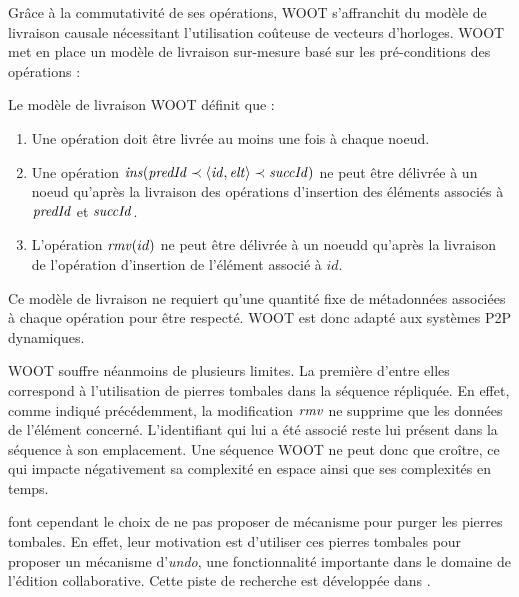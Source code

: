 Grâce à la commutativité de ses opérations, WOOT s'affranchit du modèle de livraison causale nécessitant l'utilisation coûteuse de vecteurs d'horloges.
WOOT met en place un modèle de livraison sur-mesure basé sur les pré-conditions des opérations :
\begin{definition}
  Le modèle de livraison WOOT définit que :
  \begin{enumerate}[label=(\roman*)]
    \item Une opération doit être livrée au moins une fois à chaque noeud\footnotemark.
    \item Une opération $\mathit{ins}(\mathit{predId} \prec \langle \mathit{id},\mathit{elt} \rangle \prec \mathit{succId})$ ne peut être délivrée à un noeud qu'après la livraison des opérations d'insertion des éléments associés à $\mathit{predId}$ et $\mathit{succId}$.
    \item L'opération $\mathit{rmv}(id)$ ne peut être délivrée à un noeudd qu'après la livraison de l'opération d'insertion de l'élément associé à $id$.
  \end{enumerate}
\end{definition}
Ce modèle de livraison ne requiert qu'une quantité fixe de métadonnées associées à chaque opération pour être respecté.
WOOT est donc adapté aux systèmes \ac{P2P} dynamiques.

WOOT souffre néanmoins de plusieurs limites.
La première d'entre elles correspond à l'utilisation de pierres tombales dans la séquence répliquée.
En effet, comme indiqué précédemment, la modification $\mathit{rmv}$ ne supprime que les données de l'élément concerné.
L'identifiant qui lui a été associé reste lui présent dans la séquence à son emplacement.
Une séquence WOOT ne peut donc que croître, ce qui impacte négativement sa complexité en espace ainsi que ses complexités en temps.

\textcite{2006-woot-oster} font cependant le choix de ne pas proposer de mécanisme pour purger les pierres tombales.
En effet, leur motivation est d'utiliser ces pierres tombales pour proposer un mécanisme d'\emph{undo}, une fonctionnalité importante dans le domaine de l'édition collaborative.
Cette piste de recherche est développée dans \cite{2009-undo-p2p-semantic-wikis-rahhal}.

